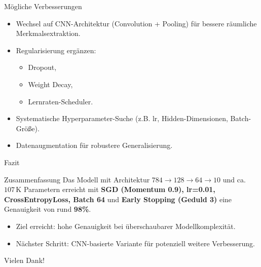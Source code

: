 \documentclass[aspectratio=169]{beamer}
\begin{document}
\begin{frame}{M\"ogliche Verbesserungen}
  \begin{itemize}
    \item Wechsel auf CNN-Architektur (Convolution + Pooling) f\"ur bessere r\"aumliche Merkmalsextraktion.
    \item Regularisierung erg\"anzen:
    \begin{itemize}
      \item Dropout,
      \item Weight Decay,
      \item Lernraten-Scheduler.
    \end{itemize}
    \item Systematische Hyperparameter-Suche (z.B. lr, Hidden-Dimensionen, Batch-Gr\"o\ss e).
    \item Datenaugmentation f\"ur robustere Generalisierung.
  \end{itemize}

\end{frame}

\begin{frame}{Fazit}
  \begin{block}{Zusammenfassung}
    Das Modell mit Architektur \(784 \rightarrow 128 \rightarrow 64 \rightarrow 10\)
    und ca. \(107\,\text{K}\) Parametern erreicht mit
    \textbf{SGD (Momentum 0.9), lr=0.01, CrossEntropyLoss, Batch 64}
    und \textbf{Early Stopping (Geduld 3)} eine Genauigkeit von rund \textbf{98\%}.
  \end{block}

  \vspace{0.3cm}
  \begin{itemize}
    \item Ziel erreicht: hohe Genauigkeit bei \"uberschaubarer Modellkomplexit\"at.
    \item N\"achster Schritt: CNN-basierte Variante f\"ur potenziell weitere Verbesserung.
  \end{itemize}

  \vspace{0.5cm}
  \centering
  \Large Vielen Dank!
\end{frame}
\end{document}
